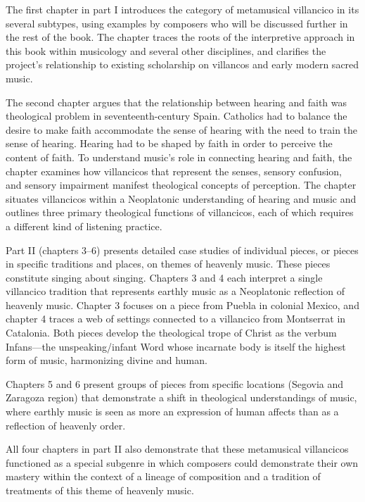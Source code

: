 \documentclass{memoir}
\begin{document}
{{{      The first chapter in part I introduces the category of metamusical villancico in its several subtypes, using examples by composers who will be discussed further in the rest of the book.
      The chapter traces the roots of the interpretive approach in this book within musicology and several other disciplines, and clarifies the project’s relationship to existing scholarship on villancos and early modern sacred music.
    
      The second chapter argues that the relationship between hearing and faith was theological problem in seventeenth-century Spain.
      Catholics had to balance the desire to make faith accommodate the sense of hearing with the need to train the sense of hearing.
      Hearing had to be shaped by faith in order to perceive the content of faith.
      To understand music’s role in connecting hearing and faith, the chapter examines how villancicos that represent the senses, sensory confusion, and sensory impairment manifest theological concepts of perception.
      The chapter situates villancicos within a Neoplatonic understanding of hearing and music and outlines three primary theological functions of villancicos, each of which requires a different kind of listening practice.
    
      Part II (chapters 3--6) presents detailed case studies of individual pieces, or pieces in specific traditions and places, on themes of heavenly music.
      These pieces constitute singing about singing.
      Chapters 3 and 4 each interpret a single villancico tradition that represents earthly music as a Neoplatonic reflection of heavenly music.
      Chapter 3 focuses on a piece from Puebla in colonial Mexico, and chapter 4 traces a web of settings connected to a villancico from Montserrat in Catalonia.
      Both pieces develop the theological trope of Christ as the verbum Infans—the unspeaking/infant Word whose incarnate body is itself the highest form of music, harmonizing divine and human.
    
      Chapters 5 and 6 present groups of pieces from specific locations (Segovia and Zaragoza region) that demonstrate a shift in theological understandings of music, where earthly music is seen as more an expression of human affects than as a reflection of heavenly order.
      
      All four chapters in part II also demonstrate that these metamusical villancicos functioned as a special subgenre in which composers could demonstrate their own mastery within the context of a lineage of composition and a tradition of treatments of this theme of heavenly music.
    
}}}
\end{document}

